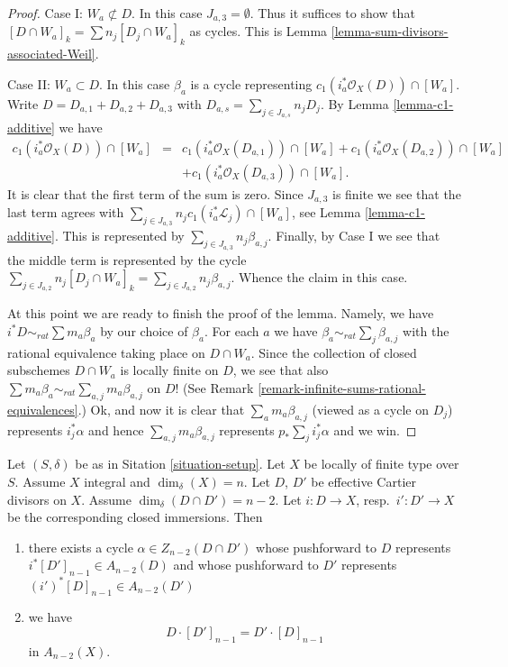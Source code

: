 \begin{proof}
\medskip\noindent
Case I: $W_a \not \subset D$. In this case $J_{a, 3} = \emptyset$.
Thus it suffices to show that
$[D \cap W_a]_k = \sum n_j [D_j \cap W_a]_k$ as cycles.
This is Lemma \ref{lemma-sum-divisors-associated-Weil}.

\medskip\noindent
Case II: $W_a \subset D$. In this case $\beta_a$ is a cycle representing
$c_1(i_a^*\mathcal{O}_X(D)) \cap [W_a]$.
Write $D = D_{a, 1} + D_{a, 2} + D_{a, 3}$ with
$D_{a, s} = \sum_{j \in J_{a, s}} n_jD_j$.
By Lemma \ref{lemma-c1-additive} we have
\begin{eqnarray*}
c_1(i_a^*\mathcal{O}_X(D)) \cap [W_a] & = &
c_1(i_a^*\mathcal{O}_X(D_{a, 1})) \cap [W_a] +
c_1(i_a^*\mathcal{O}_X(D_{a, 2})) \cap [W_a] \\
& &
 + c_1(i_a^*\mathcal{O}_X(D_{a, 3})) \cap [W_a].
\end{eqnarray*}
It is clear that the first term of the sum is zero.
Since $J_{a, 3}$ is finite we see that the last term agrees
with $\sum\nolimits_{j \in J_{a, 3}} n_jc_1(i_a^*\mathcal{L}_j) \cap [W_a]$,
see Lemma \ref{lemma-c1-additive}.
This is represented by $\sum_{j \in J_{a, 3}} n_j \beta_{a, j}$.
Finally, by Case I we see that the middle term is represented by the cycle
$\sum\nolimits_{j \in J_{a, 2}} n_j[D_j \cap W_a]_k =
\sum_{j \in J_{a, 2}} n_j\beta_{a, j}$.
Whence the claim in this case.

\medskip\noindent
At this point we are ready to finish the proof of the lemma.
Namely, we have $i^*D \sim_{rat} \sum m_a\beta_a$ by our
choice of $\beta_a$. For each $a$ we have
$\beta_a \sim_{rat} \sum_j \beta_{a, j}$ with the rational
equivalence taking place on $D \cap W_a$.
Since the collection of closed subschemes $D \cap W_a$
is locally finite on $D$, we see that also
$\sum m_a \beta_a \sim_{rat} \sum_{a, j} m_a\beta_{a, j}$
on $D$! (See Remark \ref{remark-infinite-sums-rational-equivalences}.) 
Ok, and now it is clear that $\sum_a m_a\beta_{a, j}$ (viewed
as a cycle on $D_j$) represents $i_j^*\alpha$ and hence
$\sum_{a, j} m_a\beta_{a, j}$ represents $p_* \sum_j i_j^*\alpha$
and we win.
\end{proof}

\begin{lemma}
\label{lemma-commutativity-effective-Cartier-proper-intersection}
Let $(S, \delta)$ be as in Sitation \ref{situation-setup}.
Let $X$ be locally of finite type over $S$.
Assume $X$ integral and $\dim_\delta(X) = n$.
Let $D$, $D'$ be effective Cartier divisors on $X$.
Assume $\dim_\delta(D \cap D') = n - 2$. Let $i : D \to X$,
resp.\ $i' : D' \to X$ be the corresponding closed immersions.
Then
\begin{enumerate}
\item there exists a cycle $\alpha \in Z_{n - 2}(D \cap D')$
whose pushforward to $D$ represents
$i^*[D']_{n - 1} \in A_{n - 2}(D)$
and whose pushforward to $D'$ represents
$(i')^*[D]_{n - 1} \in A_{n - 2}(D')$
\item we have
$$
D \cdot [D']_{n - 1}
=
D' \cdot [D]_{n - 1}
$$
in $A_{n - 2}(X)$.
\end{enumerate}
\end{lemma}

